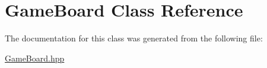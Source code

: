 \hypertarget{classGameBoard}{}\section{Game\+Board Class Reference}
\label{classGameBoard}


The documentation for this class was generated from the following file\+:\begin{DoxyCompactItemize}
\item 
\hyperlink{GameBoard_8hpp}{Game\+Board.\+hpp}\end{DoxyCompactItemize}

